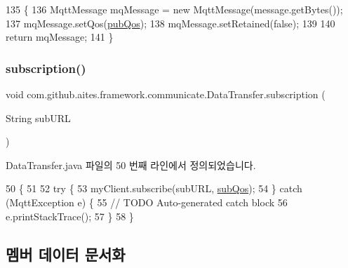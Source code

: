 \begin{DoxyCode}
135                                                       \{
136         MqttMessage mqMessage = \textcolor{keyword}{new} MqttMessage(message.getBytes());
137         mqMessage.setQos(\mbox{\hyperlink{classcom_1_1github_1_1aites_1_1framework_1_1communicate_1_1_data_transfer_a21696e0ac11bb9a9182280f35a453c03}{pubQos}});
138         mqMessage.setRetained(\textcolor{keyword}{false});
139         
140         \textcolor{keywordflow}{return} mqMessage;
141     \}
\end{DoxyCode}
\mbox{\label{classcom_1_1github_1_1aites_1_1framework_1_1communicate_1_1_data_transfer_a0abe3b63a6065ea2f43acecf7bb7ff36}} 
\subsubsection{\texorpdfstring{subscription()}{subscription()}}
{\footnotesize\ttfamily void com.\+github.\+aites.\+framework.\+communicate.\+Data\+Transfer.\+subscription (\begin{DoxyParamCaption}\item[{String}]{sub\+U\+RL }\end{DoxyParamCaption})}



Data\+Transfer.\+java 파일의 50 번째 라인에서 정의되었습니다.


\begin{DoxyCode}
50                                            \{
51      
52         \textcolor{keywordflow}{try} \{
53             myClient.subscribe(subURL, \mbox{\hyperlink{classcom_1_1github_1_1aites_1_1framework_1_1communicate_1_1_data_transfer_af8b85631e86121433d394d90b2d65eeb}{subQos}});
54         \} \textcolor{keywordflow}{catch} (MqttException e) \{
55             \textcolor{comment}{// TODO Auto-generated catch block}
56             e.printStackTrace();
57         \} 
58     \}
\end{DoxyCode}


\subsection{멤버 데이터 문서화}
\mbox{\label{classcom_1_1github_1_1aites_1_1framework_1_1communicate_1_1_data_transfer_a5333e287369f5f20c62e28cd80fe0398}} 

